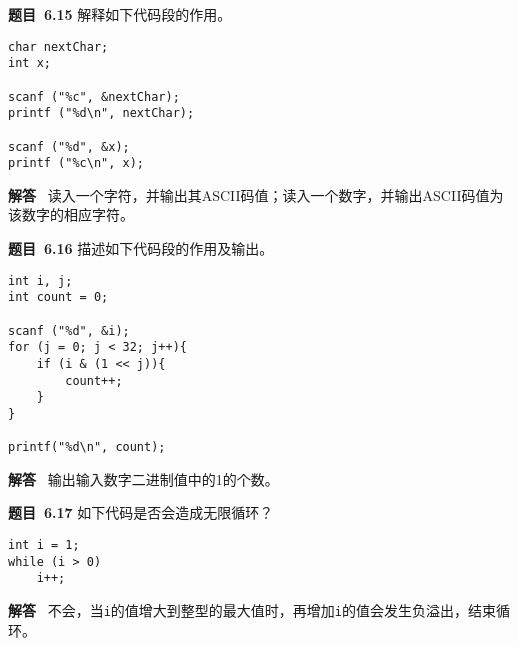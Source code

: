 \documentclass[10pt,a4paper,UTF8]{ctexart}
\newcommand{\problemname}{待定义}
\newenvironment{problem}{\begin{shaded}\par\noindent\textbf{题目\  \problemname}}{\end{shaded}\par}
\newenvironment{solution}{\par\noindent\textbf{解答}\ }{\par}
\begin{document}
\renewcommand{\problemname}{6.15}
\begin{problem}
	解释如下代码段的作用。
	\lstset{language=C}
	\begin{lstlisting}
char nextChar;
int x;

scanf ("%c", &nextChar);
printf ("%d\n", nextChar);

scanf ("%d", &x);
printf ("%c\n", x);		
	\end{lstlisting}
\end{problem}

\begin{solution}
	读入一个字符，并输出其ASCII码值；读入一个数字，并输出ASCII码值为该数字的相应字符。
\end{solution}


\renewcommand{\problemname}{6.16}
\begin{problem}
	描述如下代码段的作用及输出。
	\lstset{language=C}
	\begin{lstlisting}
int i, j;
int count = 0;

scanf ("%d", &i);
for (j = 0; j < 32; j++){
	if (i & (1 << j)){
		count++;
	}
}

printf("%d\n", count);
	\end{lstlisting}
\end{problem}

\begin{solution}
	输出输入数字二进制值中的1的个数。
\end{solution}


\renewcommand{\problemname}{6.17}
\begin{problem}
	如下代码是否会造成无限循环？
	\lstset{language=C}
	\begin{lstlisting}
int i = 1;
while (i > 0)
	i++;
	\end{lstlisting}
\end{problem}

\begin{solution}
	不会，当\verb|i|的值增大到整型的最大值时，再增加\verb|i|的值会发生负溢出，结束循环。
\end{solution}
\end{document}
